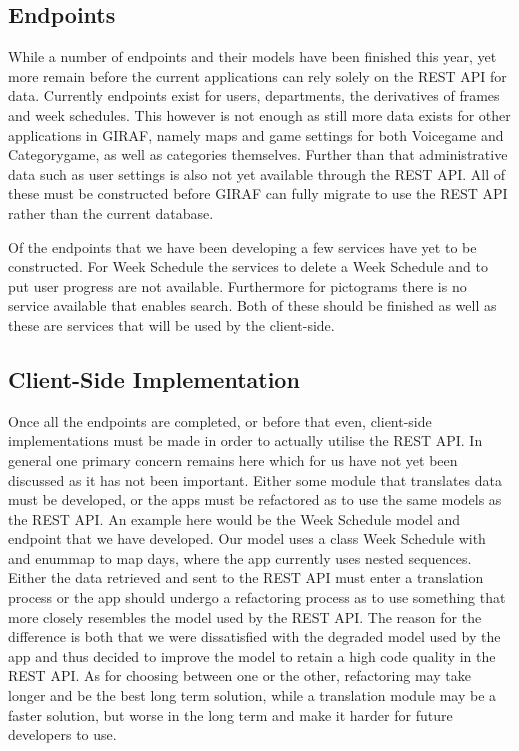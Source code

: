 \subsection{Endpoints}
While a number of endpoints and their models have been finished this year, yet more remain before the current applications can rely solely on the REST API for data.
Currently endpoints exist for users, departments, the derivatives of frames and week schedules.
This however is not enough as still more data exists for other applications in GIRAF, namely maps and game settings for both Voicegame and Categorygame, as well as categories themselves.
Further than that administrative data such as user settings is also not yet available through the REST API.
All of these must be constructed before GIRAF can fully migrate to use the REST API rather than the current database.

Of the endpoints that we have been developing a few services have yet to be constructed.
For Week Schedule the services to delete a Week Schedule and to put user progress are not available.
Furthermore for pictograms there is no service available that enables search.
Both of these should be finished as well as these are services that will be used by the client-side.
\subsection{Client-Side Implementation}
Once all the endpoints are completed, or before that even, client-side implementations must be made in order to actually utilise the REST API.
In general one primary concern remains here which for us have not yet been discussed as it has not been important.
Either some module that translates data must be developed, or the apps must be refactored as to use the same models as the REST API.
An example here would be the Week Schedule model and endpoint that we have developed.
Our model uses a class Week Schedule with and enummap to map days, where the app currently uses nested sequences.
Either the data retrieved and sent to the REST API must enter a translation process or the app should undergo a refactoring process as to use something that more closely resembles the model used by the REST API.
The reason for the difference is both that we were dissatisfied with the degraded model used by the app and thus decided to improve the model to retain a high code quality in the REST API.
As for choosing between one or the other, refactoring may take longer and be the best long term solution, while a translation module may be a faster solution, but worse in the long term and make it harder for future developers to use.

